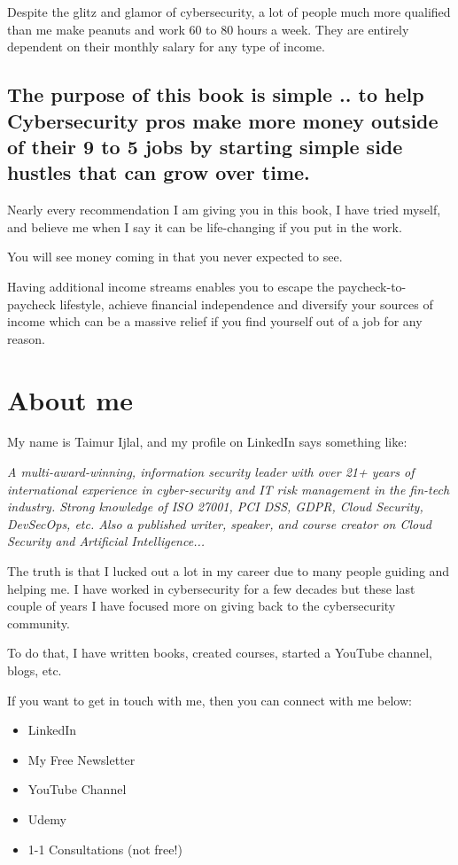 \documentclass[11pt]{article}
\begin{document}
Despite the glitz and glamor of cybersecurity, a lot of people much more qualified than me make peanuts and work 60 to 80 hours a week. They are entirely dependent on their monthly salary for any type of income.

\subsection*{The purpose of this book is simple .. to help Cybersecurity pros make more money outside of their 9 to 5 jobs by starting simple side hustles that can grow over time.}

Nearly every recommendation I am giving you in this book, I have tried myself, and believe me when I say it can be life-changing if you put in the work.

You will see money coming in that you never expected to see.

Having additional income streams enables you to escape the paycheck-to-paycheck lifestyle, achieve financial independence and diversify your sources of income which can be a massive relief if you find yourself out of a job for any reason.

\section*{About me}
My name is Taimur Ijlal, and my profile on LinkedIn says something like:

\textit{A multi-award-winning, information security leader with over 21+ years of international experience in cyber-security and IT risk management in the fin-tech industry. Strong knowledge of ISO 27001, PCI DSS, GDPR, Cloud Security, DevSecOps, etc. Also a published writer, speaker, and course creator on Cloud Security and Artificial Intelligence...}

The truth is that I lucked out a lot in my career due to many people guiding and helping me. I have worked in cybersecurity for a few decades but these last couple of years I have focused more on giving back to the cybersecurity community.

To do that, I have written books, created courses, started a YouTube channel, blogs, etc.

If you want to get in touch with me, then you can connect with me below:

\begin{itemize}
\item LinkedIn
\item My Free Newsletter
\item YouTube Channel
\item Udemy
\item 1-1 Consultations (not free!)
\end{itemize}
\end{document}
